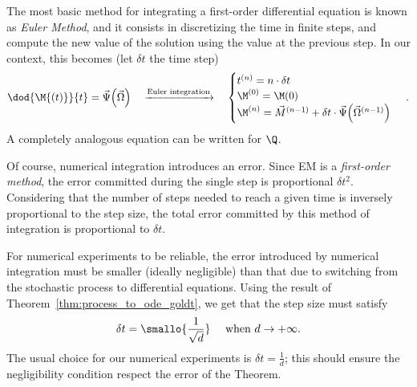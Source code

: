 The most basic method for integrating a first-order differential equation is known
as \emph{Euler Method}, and it consists in discretizing the time in finite steps,
and compute the new value of the solution using the value at the previous step.
In our context, this becomes (let \(\delta t\) the time step)
\[
  \dod{\M{\left(t\right)}}{t} = \vec{\Psi}{\left(\vec{\Omega}\right)}
  \quad\xrightarrow{\text{Euler integration}}\quad
  \begin{cases}
    t^{(n)} = n \cdot \delta t \\
    \M^{(0)} = \M(0) \\
    \M^{(n)} = \vec{M}^{(n-1)} + \delta t\cdot\vec{\Psi}{\left(\vec{\Omega}^{(n-1)}\right)}
  \end{cases}\,.
\]
A completely analogous equation can be written for \(\Q\).

Of course, numerical integration introduces an error.
Since EM is a \emph{first-order method},
the error committed during the single step is proportional \(\delta t^2\).
Considering that the number of steps needed to reach a given time is inversely proportional
to the step size, the total error committed by this method of integration
is proportional to \(\delta t\).

For numerical experiments to be reliable, the error introduced by numerical integration
must be smaller (ideally negligible) than that due to switching from the stochastic process
to differential equations. Using the result of Theorem~\ref{thm:process_to_ode_goldt},
we get that the step size must satisfy
\[
  \delta t = \smallo{\frac{1}{\sqrt{d}}}\quad \text{ when }d\to+\infty.
\]
The usual choice for our numerical experiments is \(\delta t = \frac1d\);
this should ensure the negligibility condition respect the error of the Theorem.

